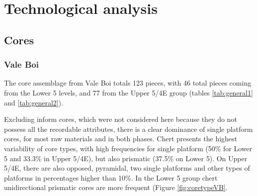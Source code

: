 \documentclass[12pt,twoside]{reedthesis}
\begin{document}
\begin{table}

\caption{\label{tab:cortextabpr}Lapa do Picareiro - Middle T. Frequencies of cortex type by raw material.}
\centering
{}
\end{table}
\hypertarget{technological-analysis}{%
\section{Technological analysis}\label{technological-analysis}}

\hypertarget{cores}{%
\subsection{Cores}\label{cores}}

\hypertarget{vale-boi-4}{%
\subsubsection{Vale Boi}\label{vale-boi-4}}

The core assemblage from Vale Boi totals 123 pieces, with 46 total pieces coming from the Lower 5 levels, and 77 from the Upper 5/4E group (tables \ref{tab:general1} and \ref{tab:general2}).

Excluding inform cores, which were not considered here because they do not possess all the recordable attributes, there is a clear dominance of single platform cores, for most raw materials and in both phases. Chert presents the highest variability of core types, with high frequencies for single platform (50\% for Lower 5 and 33.3\% in Upper 5/4E), but also prismatic (37.5\% on Lower 5). On Upper 5/4E, there are also opposed, pyramidal, two single platforms and other types of platforms in percentages higher than 10\%. In the Lower 5 group chert unidirectional prismatic cores are more frequent (Figure \ref{fig:coretypeVB}.
\end{document}
